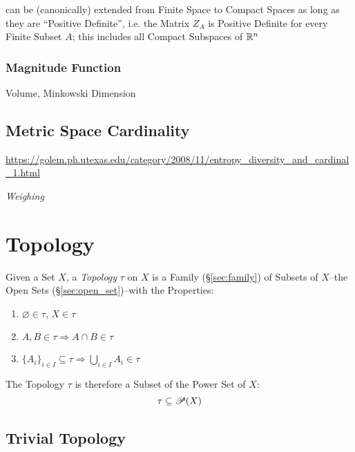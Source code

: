 can be (canonically) extended from Finite Space to Compact Spaces as
long as they are ``Positive Definite'', i.e. the Matrix $Z_A$ is
Positive Definite for every Finite Subset $A$; this includes all
Compact Subspaces of $\mathbb{R}^n$



\subsubsection{Magnitude Function}\label{sec:magnitude_function}

Volume, Minkowski Dimension



\subsection{Metric Space Cardinality}\label{sec:metric_cardinality}

\url{https://golem.ph.utexas.edu/category/2008/11/entropy_diversity_and_cardinal_1.html}

\emph{Weighing}



\section{Topology}\label{sec:topology}

Given a Set $X$, a \emph{Topology} $\tau$ on $X$ is a Family
(\S\ref{sec:family}) of Subsets of $X$--the Open Sets
(\S\ref{sec:open_set})--with the Properties:
\begin{enumerate}
  \item $\varnothing \in \tau$, $X \in \tau$
  \item $A,B \in \tau \Rightarrow A \cap B \in \tau$
  \item $\{A_i\}_{i \in I} \subseteq \tau \Rightarrow \bigcup_{i \in
  I} A_i \in \tau$
\end{enumerate}
The Topology $\tau$ is therefore a Subset of the Power Set of $X$:
\[
  \tau \subseteq \mathscr{P}(X)
\]



\subsection{Trivial Topology}\label{sec:trivial_topology}

